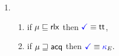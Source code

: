 \begin{minipage}{1.0\linewidth}
\begin{multicols}{2}
\begin{enumerate}[topsep=0pt,label=(\textsc{r}\arabic*),ref=\textsc{r}\arabic*]
    \item[] 
      \begin{enumerate}[leftmargin=0pt]
      \item \label{read-term-nonempty-ca}
        if $\mu\sqsubseteq{\mathsf{rlx}}$ then $\aTerm \riff \TRUE$,
      \item \label{read-term-empty-ca}
        if $\mu\sqsupseteq{\mathsf{acq}}$ then
        \begin{math}
          \aTerm \riff
          \kappaE{}. %
        \end{math}
      \end{enumerate}      
    \end{enumerate}
  \end{multicols}
\end{minipage}

